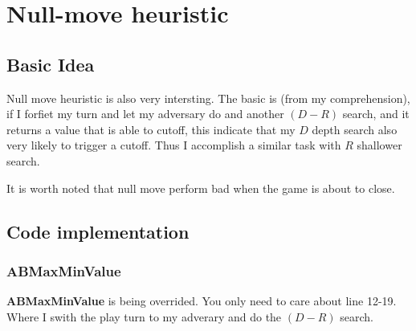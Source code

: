 \documentclass{article}
\begin{document}
\clearpage
\section{Null-move heuristic}
\subsection{Basic Idea}
Null move heuristic is also very intersting. The basic is (from my comprehension), if I forfiet my turn and let my adversary do and another $(D - R)$ search, and it returns a value that is able to cutoff, this indicate that my $D$ depth search also very likely to trigger a cutoff. Thus I accomplish a similar task with $R$ shallower search.

It is worth noted that null move perform bad when the game is about to close.

\subsection{Code implementation}



\subsubsection{ABMaxMinValue}

\textbf{ABMaxMinValue} is being overrided. You only need to care about line 12-19. Where I swith the play turn to my adverary and do the $(D - R)$ search. 
\end{document}
